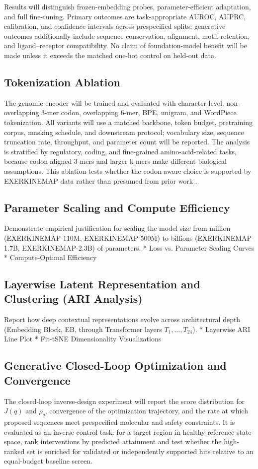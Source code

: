 \documentclass[11pt]{article}
\begin{document}
Results will distinguish frozen-embedding probes, parameter-efficient adaptation, and full fine-tuning. Primary outcomes are task-appropriate AUROC, AUPRC, calibration, and confidence intervals across prespecified splits; generative outcomes additionally include sequence conservation, alignment, motif retention, and ligand--receptor compatibility. No claim of foundation-model benefit will be made unless it exceeds the matched one-hot control on held-out data.

\subsection{Tokenization Ablation}
The genomic encoder will be trained and evaluated with character-level, non-overlapping 3-mer codon, overlapping 6-mer, BPE, unigram, and WordPiece tokenization. All variants will use a matched backbone, token budget, pretraining corpus, masking schedule, and downstream protocol; vocabulary size, sequence truncation rate, throughput, and parameter count will be reported. The analysis is stratified by regulatory, coding, and fine-grained amino-acid-related tasks, because codon-aligned 3-mers and larger k-mers make different biological assumptions. This ablation tests whether the codon-aware choice is supported by EXERKINEMAP data rather than presumed from prior work \cite{boshar2024,veiner2026}.

\subsection{Parameter Scaling and Compute Efficiency}
Demonstrate empirical justification for scaling the model size from million (EXERKINEMAP-110M, EXERKINEMAP-500M) to billions (EXERKINEMAP-1.7B, EXERKINEMAP-2.3B) of parameters. 
* Loss vs. Parameter Scaling Curves
* Compute-Optimal Efficiency 

\subsection{Layerwise Latent Representation and Clustering (ARI Analysis)}
Report how deep contextual representations evolve across architectural depth (Embedding Block, EB, through Transformer layers $T_1,\dots,T_{24}$).
* Layerwise ARI Line Plot
* Fit-tSNE Dimensionality Visualizations

\subsection{Generative Closed-Loop Optimization and Convergence}
The closed-loop inverse-design experiment will report the score distribution for $J(q)$ and $\rho_q$, convergence of the optimization trajectory, and the rate at which proposed sequences meet prespecified molecular and safety constraints. It is evaluated as an inverse-control task: for a target region in healthy-reference state space, rank interventions by predicted attainment and test whether the high-ranked set is enriched for validated or independently supported hits relative to an equal-budget baseline screen.
\end{document}
